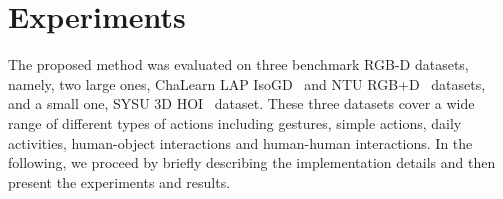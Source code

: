 \documentclass[letterpaper]{article} %
\begin{document}
\begin{table}[!ht]
\centering
\caption{Results and comparison on the ChaLearn LAP IsoGD Dataset using ConvNet
and c-ConvNet. \label{ISOcom}}
\end{table}



\section{Experiments}\label{results}
The proposed method was evaluated on three benchmark RGB-D
datasets,
namely, two large ones, ChaLearn LAP IsoGD~\cite{wanchalearn} and NTU
RGB+D~\cite{shahroudy2016ntu} datasets, and a small one, SYSU 3D
HOI~\cite{hu2015jointly} dataset. These three datasets cover a wide range of
different types of actions including gestures, simple actions, daily activities,
human-object interactions and human-human interactions. In the following, we
proceed by briefly describing the implementation details and then present the
experiments and results.
\end{document}

